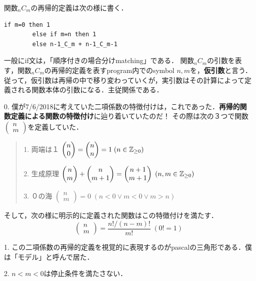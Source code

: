 \documentclass[uplatex, dvipdfmx]{jsreport}
\begin{document}
\begin{definition}[再帰的関数定義]
    関数${}_nC_m$の再帰的定義は次の様に書く．
    \begin{lstlisting}[caption=recursive definition]
        if m=0 then 1
        else if m=n then 1
        else n-1_C_m + n-1_C_m-1
    \end{lstlisting}
    一般にif文は，「順序付きの場合分けmatching」である．
    関数${}_nC_m$の引数を表す，関数${}_nC_m$の再帰的定義を表すprogram内でのsymbol $n,m$を，\textbf{仮引数}と言う．
    従って，仮引数は再帰の中で移り変わっていくが，実引数はその計算によって定義される関数本体の引数になる．主従関係である．
\end{definition}
\begin{remark}
    0. 僕が7/6/2018に考えていた二項係数の特徴付けは，これであった．\textbf{再帰的関数定義による関数の特徴付け}に辿り着いていたのだ！
    その際は次の３つで関数$\begin{pmatrix}n\\m\end{pmatrix}$を定義していた．
    \begin{quotation}
        1. 両端は１ $\begin{pmatrix}n\\0\end{pmatrix}=\begin{pmatrix}n\\n\end{pmatrix}=1\;(n\in\mathbb{Z}_{\ge 0})$

        2. 生成原理 $\begin{pmatrix}n\\m\end{pmatrix} + \begin{pmatrix}n\\m+1\end{pmatrix} = \begin{pmatrix}n+1\\m+1\end{pmatrix}\;(n,m\in\mathbb{Z}_{\ge 0})$

        3. ０の海 $\begin{pmatrix}n\\m\end{pmatrix}=0\;(n<0\lor m<0\lor m>n)$
    \end{quotation}
    そして，次の様に明示的に定義された関数はこの特徴付けを満たす．
    \[ \begin{pmatrix}n\\m\end{pmatrix} = \frac{n!/(n-m)!}{m!}\;(0!=1) \]

    1. この二項係数の再帰的定義を視覚的に表現するのがpascalの三角形である．僕は「モデル」と呼んで居た．

    2. $n<m<0$は停止条件を満たさない．
\end{remark}
\end{document}
